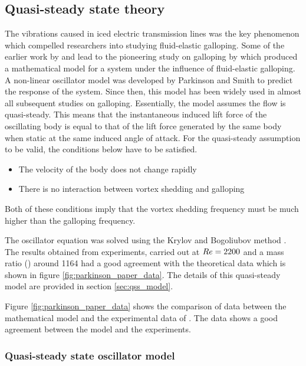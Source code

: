 \subsection{Quasi-steady state theory}
\label{sec:QSS theory}


The vibrations caused in iced electric transmission lines was the key phenomenon which compelled researchers into studying fluid-elastic galloping. Some of the earlier work by \cite{Glauert1919} and \cite{DenHartog1956} lead to the pioneering study on galloping by \cite{Parkinson1964} which produced a mathematical model for a system under the influence of fluid-elastic galloping. A non-linear oscillator model was developed by Parkinson and Smith to predict the response of the system. Since then, this model has been widely used in almost all subsequent studies on galloping. Essentially, the model assumes the flow is quasi-steady. This means that the instantaneous induced lift force of the oscillating body is equal to that of the lift force generated by the same body when static at the same induced angle of attack. For the quasi-steady assumption to be valid, the conditions below have to be satisfied.

\begin{itemize}
 \item The velocity of the body does not change rapidly
 \item There is no interaction between vortex shedding and galloping
\end{itemize}

Both of these conditions imply that the vortex shedding frequency must be much higher than the galloping frequency.

The oscillator equation was solved using the Krylov and Bogoliubov method \citep{Parkinson1964}. The results obtained from experiments, carried out at $Re=2200$ and a mass ratio (\mstar) around 1164 had a good agreement with the theoretical data which is shown in figure \ref{fig:parkinson_paper_data}. The details of this quasi-steady model are provided in section \ref{sec:qss_model}.



Figure \ref{fig:parkinson_paper_data} shows the comparison of data between the mathematical model and the experimental data of \citep{Parkinson1964}. The data shows a good agreement between the model and the experiments.  

\subsubsection*{Quasi-steady state oscillator model}
\label{sec:qss_model}

